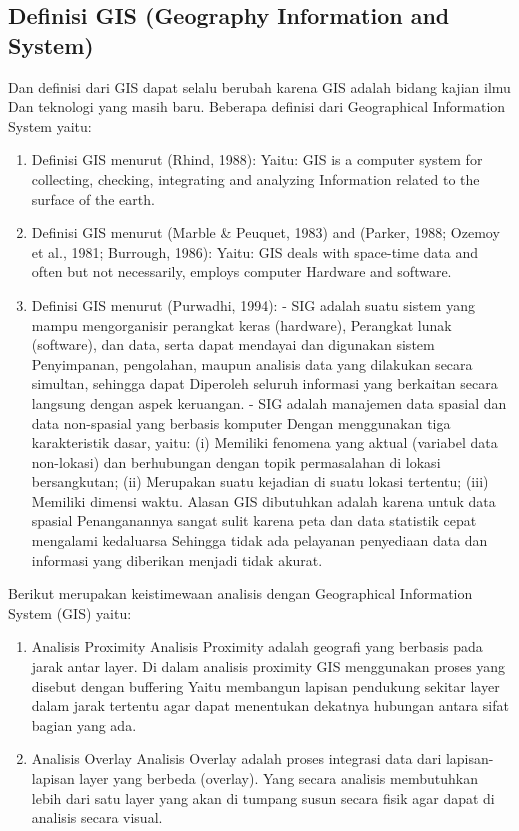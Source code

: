 \subsection{Definisi GIS (Geography Information and System)}
Dan definisi dari GIS dapat selalu berubah karena GIS adalah bidang kajian ilmu 
Dan teknologi yang masih baru. Beberapa definisi dari Geographical Information System yaitu:
\begin{enumerate}
\item Definisi GIS menurut (Rhind, 1988):
Yaitu: GIS is a computer system for collecting, checking, integrating and analyzing
Information related to the surface of the earth.

\item Definisi GIS menurut (Marble \& Peuquet, 1983) and (Parker,
1988; Ozemoy et al., 1981; Burrough, 1986):
Yaitu: GIS deals with space-time data and often but not necessarily, employs computer
Hardware and software.

\item Definisi GIS menurut (Purwadhi, 1994):
- SIG adalah suatu sistem yang mampu mengorganisir perangkat keras (hardware),
Perangkat lunak (software), dan data, serta dapat mendayai dan digunakan sistem
Penyimpanan, pengolahan, maupun analisis data yang dilakukan secara simultan, sehingga dapat
Diperoleh seluruh informasi yang berkaitan secara langsung dengan aspek keruangan.
- SIG adalah manajemen data spasial dan data non-spasial yang berbasis komputer
Dengan menggunakan tiga karakteristik dasar, yaitu: 
(i) Memiliki fenomena yang aktual (variabel data non-lokasi) dan berhubungan dengan topik permasalahan di lokasi bersangkutan; 
(ii) Merupakan suatu kejadian di suatu lokasi tertentu; 
(iii) Memiliki dimensi waktu. Alasan GIS dibutuhkan adalah karena untuk data spasial 
Penanganannya sangat sulit karena peta dan data statistik cepat mengalami kedaluarsa 
Sehingga tidak ada pelayanan penyediaan data dan informasi yang diberikan menjadi tidak akurat.
\end{enumerate} 

Berikut merupakan keistimewaan analisis dengan Geographical Information System (GIS) yaitu:
\begin{enumerate}
\item Analisis Proximity
Analisis Proximity adalah geografi yang berbasis pada jarak antar layer.
Di dalam analisis proximity GIS menggunakan proses yang disebut dengan buffering
Yaitu membangun lapisan pendukung sekitar layer dalam jarak tertentu agar dapat menentukan
dekatnya hubungan antara sifat bagian yang ada.
\item Analisis Overlay
Analisis Overlay adalah proses integrasi data dari lapisan-lapisan layer yang berbeda (overlay).
Yang secara analisis membutuhkan lebih dari satu layer yang akan di tumpang susun secara
fisik agar dapat di analisis secara visual.
\end{enumerate}

